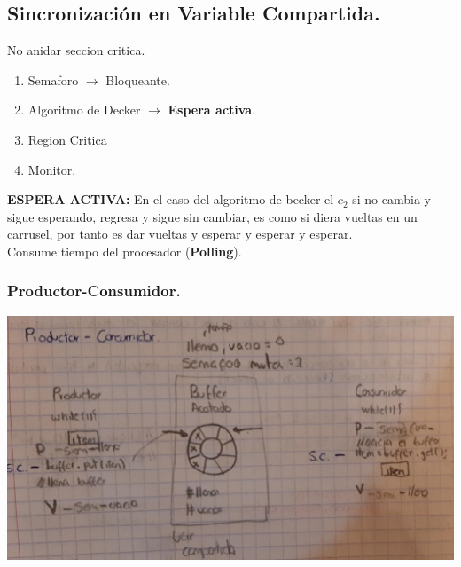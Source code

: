 \documentclass[12pt]{article}
\begin{document}
{\color{blue} \subsection*{Sincronización en Variable Compartida.}}

No anidar seccion critica.\\

\begin{enumerate}
    \item Semaforo $\rightarrow$ Bloqueante.
    \item Algoritmo de Decker $\rightarrow$ \textbf{Espera activa}.
    \item Region Critica
    \item Monitor.
\end{enumerate}

\textbf{ESPERA ACTIVA:} En el caso del algoritmo de becker el $c_2$ si no cambia y sigue esperando, regresa y sigue sin cambiar, es como si diera vueltas
en un carrusel, por tanto es dar vueltas y esperar y esperar y esperar.\\
Consume tiempo del procesador (\textbf{Polling}).\\

{\color{blue} \subsubsection*{Productor-Consumidor.}}
\vspace{1em}

\includegraphics[scale = 0.40]{images/esquema8.jpeg} \\
\end{document}
